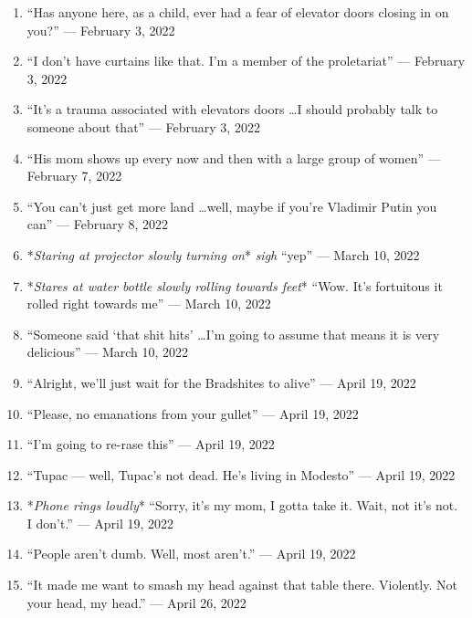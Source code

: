 \documentclass[12pt]{article}
\begin{document}
\begin{enumerate}
  \item “Has anyone here, as a child, ever had a fear of elevator doors closing in on you?” — February 3, 2022

  \item “I don't have curtains like that. I'm a member of the proletariat” — February 3, 2022

  \item “It's a trauma associated with elevators doors \dots I should probably talk to someone about that” — February 3, 2022

  \item “His mom shows up every now and then with a large group of women” — February 7, 2022

  \item “You can't just get more land \dots well, maybe if you're Vladimir Putin you can” — February 8, 2022

  \item *\textit{Staring at projector slowly turning on}* \textit{sigh} “yep” — March 10, 2022

  \item *\textit{Stares at water bottle slowly rolling towards feet}* “Wow. It's fortuitous it rolled right towards me” — March 10, 2022

  \item “Someone said `that shit hits' \dots I'm going to assume that means it is very delicious” — March 10, 2022

  \item “Alright, we'll just wait for the Bradshites to alive” — April 19, 2022

  \item “Please, no emanations from your gullet” — April 19, 2022

  \item “I'm going to re-rase this” — April 19, 2022

  \item “Tupac — well, Tupac's not dead. He's living in Modesto” — April 19, 2022

  \item *\textit{Phone rings loudly}* “Sorry, it's my mom, I gotta take it. Wait, not it's not. I don't.” — April 19, 2022

  \item “People aren't dumb. Well, most aren't.” — April 19, 2022

  \item “It made me want to smash my head against that table there. Violently. Not your head, my head.” — April 26, 2022
    
\end{enumerate}
\end{document}
